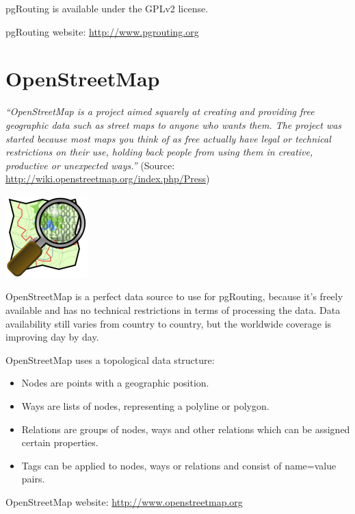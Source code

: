 \documentclass[a4paper,10pt,english]{manual}
\begin{document}
pgRouting is available under the GPLv2 license.

pgRouting website: \href{http://www.pgrouting.org}{http://www.pgrouting.org}


\section{OpenStreetMap}

\emph{``OpenStreetMap is a project aimed squarely at creating and providing free geographic data such as street maps to anyone who wants them. The project was started because most maps you think of as free actually have legal or technical restrictions on their use, holding back people from using them in creative, productive or unexpected ways.''} (Source: \href{http://wiki.openstreetmap.org/index.php/Press}{http://wiki.openstreetmap.org/index.php/Press})

\includegraphics{osm_logo.png}

OpenStreetMap is a perfect data source to use for pgRouting, because it's freely available and has no technical restrictions in terms of processing the data. Data availability still varies from country to country, but the worldwide coverage is improving day by day.

OpenStreetMap uses a topological data structure:
\begin{itemize}
\item {} 
Nodes are points with a geographic position.

\item {} 
Ways are lists of nodes, representing a polyline or polygon.

\item {} 
Relations are groups of nodes, ways and other relations which can be assigned certain properties.

\item {} 
Tags can be applied to nodes, ways or relations and consist of name=value pairs.

\end{itemize}

OpenStreetMap website: \href{http://www.openstreetmap.org}{http://www.openstreetmap.org}
\end{document}
